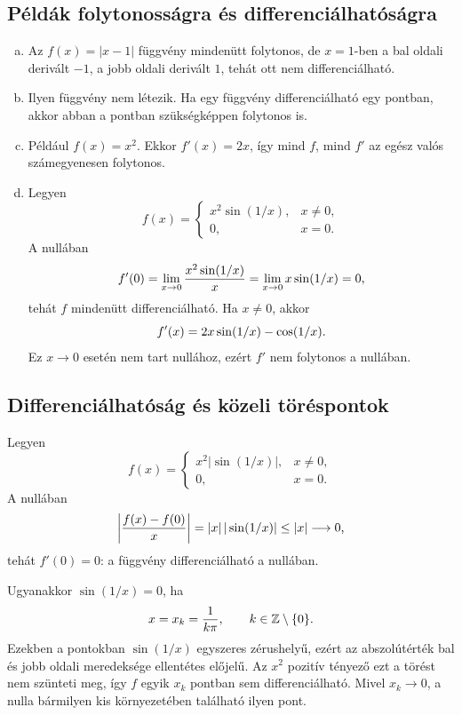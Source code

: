 \documentclass{szb-solution}
\begin{document}
\subsection{Példák folytonosságra és differenciálhatóságra}

\begin{enumerate}[a)]
  \item Az $f(x)=|x-1|$ függvény mindenütt folytonos, de $x=1$-ben a bal
        oldali derivált $-1$, a jobb oldali derivált $1$, tehát ott nem
        differenciálható.

  \item Ilyen függvény nem létezik. Ha egy függvény differenciálható egy
        pontban, akkor abban a pontban szükségképpen folytonos is.

  \item Például $f(x)=x^2$. Ekkor $f'(x)=2x$, így mind $f$, mind $f'$ az egész
        valós számegyenesen folytonos.

  \item Legyen
        $$
          f(x)=
          \begin{cases}
            x^2\sin(1/x),&x\neq0,\\
            0,&x=0.
          \end{cases}
        $$
        A nullában
        $$
          f'(0)=\lim_{x\to0}\frac{x^2\sin(1/x)}x
          =\lim_{x\to0}x\sin(1/x)=0
          \text,
        $$
        tehát $f$ mindenütt differenciálható. Ha $x\neq0$, akkor
        $$
          f'(x)=2x\sin(1/x)-\cos(1/x)
          \text.
        $$
        Ez $x\to0$ esetén nem tart nullához, ezért $f'$ nem folytonos a
        nullában.
\end{enumerate}

\subsection{Differenciálhatóság és közeli töréspontok}

Legyen
$$
  f(x)=
  \begin{cases}
    x^2|\sin(1/x)|,&x\neq0,\\
    0,&x=0.
  \end{cases}
$$
A nullában
$$
  \left|\frac{f(x)-f(0)}{x}\right|
  =|x|\,|\sin(1/x)|\leq|x|\longrightarrow0
  \text,
$$
tehát $f'(0)=0$: a függvény differenciálható a nullában.

Ugyanakkor $\sin(1/x)=0$, ha
$$
  x=x_k=\frac1{k\pi},
  \qquad k\in\mathbb Z\setminus\{0\}
  \text.
$$
Ezekben a pontokban $\sin(1/x)$ egyszeres zérushelyű, ezért az abszolútérték
bal és jobb oldali meredeksége ellentétes előjelű. Az $x^2$ pozitív tényező ezt
a törést nem szünteti meg, így $f$ egyik $x_k$ pontban sem differenciálható.
Mivel $x_k\to0$, a nulla bármilyen kis környezetében található ilyen pont.
\end{document}
